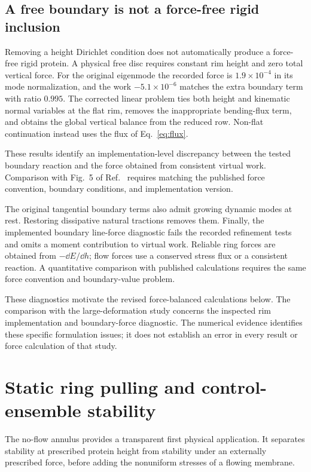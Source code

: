 \subsection{A free boundary is not a force-free rigid inclusion}


Removing a height Dirichlet condition does not automatically produce a force-free rigid protein. A physical free disc requires constant rim height and zero total vertical force. For the original  eigenmode the recorded force is $1.9\times10^{-4}$ in its mode normalization, and the work $-5.1\times10^{-6}$ matches the extra boundary term with ratio $0.995$. The corrected linear problem ties both height and kinematic normal variables at the flat rim, removes the inappropriate bending-flux term, and obtains the global vertical balance from the reduced row. Non-flat continuation instead uses the flux of Eq.~\eqref{eq:flux}.

These results identify an implementation-level discrepancy between the tested boundary reaction and the force obtained from consistent virtual work. Comparison with Fig.~5 of Ref.~\cite{ferraro} requires matching the published force convention, boundary conditions, and implementation version.


The original tangential boundary terms also admit growing dynamic modes at rest. Restoring dissipative natural tractions removes them. Finally, the implemented boundary line-force diagnostic fails the recorded refinement tests and omits a moment contribution to virtual work. Reliable ring forces are obtained from $-\dd E/\dd h$; flow forces use a conserved stress flux or a consistent reaction. A quantitative comparison with published calculations requires the same force convention and boundary-value problem.


These diagnostics motivate the revised force-balanced calculations below. The comparison with the large-deformation study \cite{ferraro} concerns the inspected rim implementation and boundary-force diagnostic. The numerical evidence identifies these specific formulation issues; it does not establish an error in every result or force calculation of that study.


\section{Static ring pulling and control-ensemble stability}\label{sec:ring}
The no-flow annulus provides a transparent first physical application. It separates stability at prescribed protein height from stability under an externally prescribed force, before adding the nonuniform stresses of a flowing membrane.


